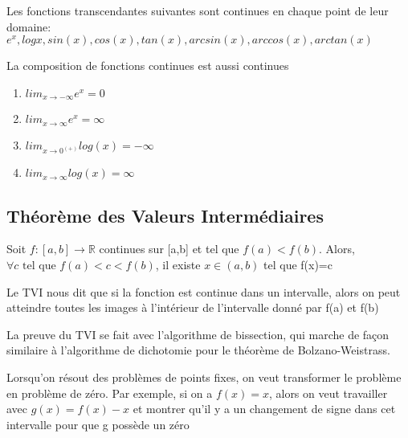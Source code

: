 \documentclass{article}
\begin{document}
\begin{proposition}
    Les fonctions transcendantes suivantes sont continues en chaque point
    de leur domaine: $e^x, log x, sin(x), cos(x), tan(x), arcsin(x),
    arccos(x), arctan(x)$
\end{proposition}

\begin{proposition}
    La composition de fonctions continues est aussi continues
\end{proposition}

\begin{proposition}
    \begin{enumerate}
	\item $lim_{x \to -\infty} e^x = 0$
	\item $lim_{x \to \infty} e^x = \infty$
	\item $lim_{x \to 0^(+)} log(x) = -\infty$
	\item $lim_{x \to \infty} log(x) = \infty$
    \end{enumerate}
\end{proposition}


\subsection{Théorème des Valeurs Intermédiaires}

\begin{theorem}
    Soit $f:[a,b] \to \mathbb{R}$ continues sur [a,b] et tel que
    $f(a)<f(b)$. Alors, $\forall c \text{ tel que } f(a)<c<f(b)$,
    il existe $x \in (a,b)$ tel que f(x)=c
\end{theorem}

\begin{intuition}
    Le TVI nous dit que si la fonction est continue dans un intervalle,
    alors on peut atteindre toutes les images à l'intérieur de l'intervalle
    donné par f(a) et f(b)
\end{intuition}

\begin{remark}
    La preuve du TVI se fait avec l'algorithme de bissection, qui marche
    de façon similaire à l'algorithme de dichotomie pour le théorème
    de Bolzano-Weistrass.
\end{remark}

\begin{problem}
    Lorsqu'on résout des problèmes de points fixes, on veut transformer
    le problème en problème de zéro. Par exemple, si on a $f(x)=x$, alors
    on veut travailler avec $g(x) = f(x)-x$ et montrer qu'il y a un
    changement de signe dans cet intervalle pour que g possède un zéro
\end{problem}
\end{document}
